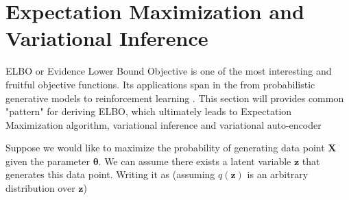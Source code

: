 



\section{Expectation Maximization and Variational Inference}

ELBO or Evidence Lower Bound Objective is one of the most interesting and fruitful objective functions. Its applications span in the from probabilistic generative models \cite{kingma2013auto} to reinforcement learning \cite{levine2018reinforcement}. This section will provides common "pattern" for deriving ELBO, which ultimately leads to Expectation Maximization algorithm, variational inference and variational auto-encoder \cite{kingma2013auto}  


Suppose we would like to maximize the probability of generating data point $\boldsymbol{X}$ given the parameter $\boldsymbol{\theta}$. We can assume there exists a latent variable $\boldsymbol{z}$ that generates this data point. Writing it as (assuming $q(\boldsymbol{z})$ is an arbitrary distribution over $\boldsymbol{z}$)

